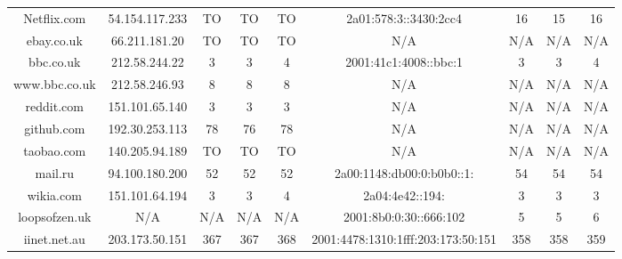 \begin{sidewaysfigure}
\begin{tabular}{@{}ccccccccc@{}}
Netflix.com       & 54.154.117.233 & TO     & TO     & TO     & 2a01:578:3::3430:2cc4              & 16     & 15     & 16     \\
ebay.co.uk        & 66.211.181.20  & TO     & TO     & TO     & N/A                                & N/A    & N/A    & N/A    \\
bbc.co.uk         & 212.58.244.22  & 3      & 3      & 4      & 2001:41c1:4008::bbc:1              & 3      & 3      & 4      \\
www.bbc.co.uk     & 212.58.246.93  & 8      & 8      & 8      & N/A                                & N/A    & N/A    & N/A    \\
reddit.com        & 151.101.65.140 & 3      & 3      & 3      & N/A                                & N/A    & N/A    & N/A    \\
github.com        & 192.30.253.113 & 78     & 76     & 78     & N/A                                & N/A    & N/A    & N/A    \\
taobao.com        & 140.205.94.189 & TO     & TO     & TO     & N/A                                & N/A    & N/A    & N/A    \\
mail.ru           & 94.100.180.200 & 52     & 52     & 52     & 2a00:1148:db00:0:b0b0::1:          & 54     & 54     & 54     \\
wikia.com         & 151.101.64.194 & 3      & 3      & 4      & 2a04:4e42::194:                    & 3      & 3      & 3      \\
loopsofzen.uk     & N/A            & N/A    & N/A    & N/A    & 2001:8b0:0:30::666:102             & 5      & 5      & 6      \\
iinet.net.au      & 203.173.50.151 & 367    & 367    & 368    & 2001:4478:1310:1fff:203:173:50:151 & 358    & 358    & 359    \\ \bottomrule
\end{tabular}
\end{sidewaysfigure}